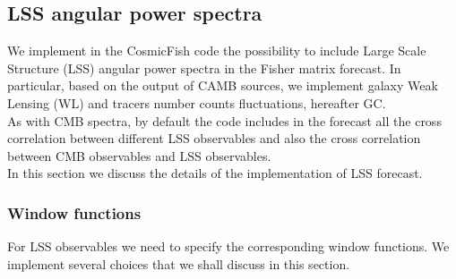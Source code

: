 \documentclass[prd,nofootinbib,showpacs]{revtex4}
\begin{document}
%
\subsection{LSS angular power spectra} \label{SubSec:LSS}
%

We implement in the CosmicFish code the possibility to include Large Scale Structure (LSS) angular power spectra in the Fisher matrix forecast.
In particular, based on the output of CAMB sources, we implement galaxy Weak Lensing (WL) and tracers number counts fluctuations, hereafter GC. \\
As with CMB spectra, by default the code includes in the forecast all the cross correlation between different LSS observables and also the cross correlation between CMB observables and LSS observables. \\
%
In this section we discuss the details of the implementation of LSS forecast.

%
\subsubsection{Window functions}
%
For LSS observables we need to specify the corresponding window functions. We implement several choices that we shall discuss in this section.
\end{document}

